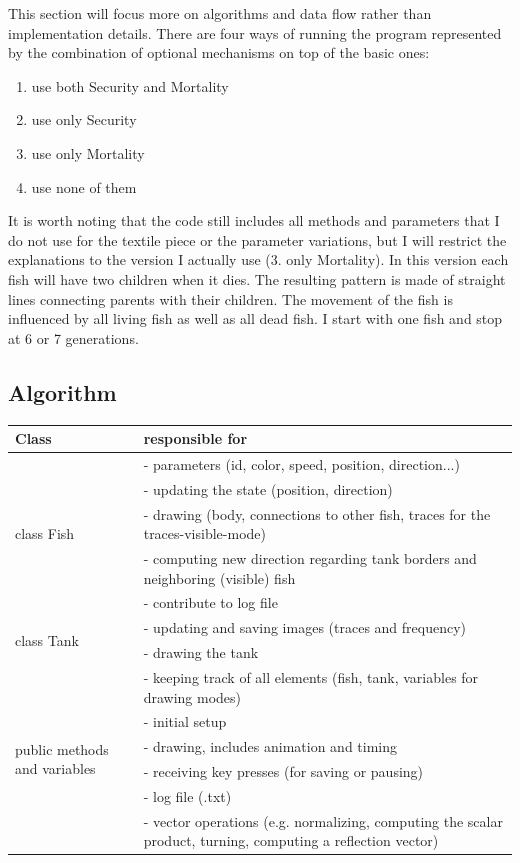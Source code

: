 \documentclass{scrartcl}
\begin{document}
This section will focus more on algorithms and data flow rather than implementation details.
There are four ways of running the program represented by the combination of optional mechanisms on top of the basic ones:
\begin{enumerate}
\item use both Security and Mortality
\item use only Security
\item use only Mortality
\item use none of them
\end{enumerate}

It is worth noting that the code still includes all methods and parameters that I do not use for the textile piece or the parameter variations, but I will restrict the explanations to the version I actually use (3. only Mortality).
In this version each fish will have two children when it dies. The resulting pattern is made of straight lines connecting parents with their children. The movement of the fish is influenced by all living fish as well as all dead fish. I start with one fish and stop at 6 or 7 generations.

\subsection{Algorithm}

\begin{tabular}{ p{} | p{} }                    
  Class & responsible for \\
  \hline \hline
  \multirow{5}{*}{class Fish}
  		& - parameters (id, color, speed, position, direction...) \\
  		& - updating the state (position, direction)\\
  		& - drawing (body, connections to other fish, traces for the traces-visible-mode)\\
  		& - computing new direction regarding tank borders and neighboring (visible) fish\\
  		& - contribute to log file\\
  \hline
  \multirow{2}{*}{class Tank}
  		& - updating and saving images (traces and frequency)\\
  		& - drawing the tank\\
  \hline
  \multirow{6}{*}{public methods and variables}
  		& - keeping track of all elements (fish, tank, variables for drawing modes)\\
  		& - initial setup\\
  		& - drawing, includes animation and timing\\
	  	& - receiving key presses (for saving or pausing)\\
	  	& - log file (.txt)\\
	  	& - vector operations (e.g. normalizing, computing the scalar product, turning, computing a reflection vector)\\
  
  \hline  
\end{tabular}
\end{document}
